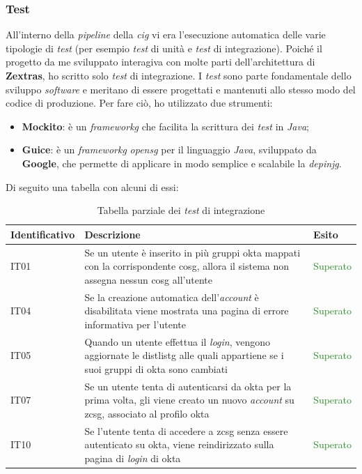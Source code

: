 \subsubsection{Test}
All'interno della \textit{pipeline} della \textit{\gls{cig}} vi era l'esecuzione automatica delle varie tipologie di \textit{test} (per esempio \textit{test} di unità e \textit{test} di integrazione). Poiché il progetto da me sviluppato interagiva con molte parti dell'architettura di \textbf{Zextras}, ho scritto solo \textit{test} di integrazione. I \textit{test} sono parte fondamentale dello sviluppo \textit{software} e meritano di essere progettati e mantenuti allo stesso modo del codice di produzione. Per fare ciò, ho utilizzato due strumenti:
\begin{itemize}
    \item \textbf{Mockito}: è un \textit{\gls{frameworkg}} che facilita la scrittura dei \textit{test} in \textit{Java}; 
    \item \textbf{Guice}: è un \textit{\gls{frameworkg}} \textit{\gls{opensg}} per il linguaggio \textit{Java}, sviluppato da \textbf{Google}, che permette di applicare in modo semplice e scalabile la \textit{\gls{depinjg}}.
\end{itemize}
Di seguito una tabella con alcuni di essi:

\begin{center}
    \begin{table}[h]
    \def\arraystretch{1.65}
    \begin{tabular}{|p{3cm}|p{7cm}|p{2cm}|}
        \hline
        \textbf{Identificativo} & \textbf{Descrizione} & \textbf{Esito} \\ \hline  
        IT01 & Se un utente è inserito in più gruppi \gls{okta} mappati con la corrispondente \gls{cosg}, allora il sistema non assegna nessun \gls{cosg} all'utente & \textcolor{ForestGreen}{Superato}\\ \hline
        IT04 & Se la creazione automatica dell'\textit{account} è disabilitata viene mostrata una pagina di errore informativa per l'utente & \textcolor{ForestGreen}{Superato}\\ \hline
        IT05 & Quando un utente effettua il \textit{login}, vengono aggiornate le \gls{distlistg} alle quali appartiene se i suoi gruppi di \gls{okta} sono cambiati & \textcolor{ForestGreen}{Superato}\\ \hline
        IT07 & Se un utente tenta di autenticarsi da \gls{okta} per la prima volta, gli viene creato un nuovo \textit{account} su \gls{zcsg}, associato al profilo \gls{okta} & \textcolor{ForestGreen}{Superato}\\ \hline
        IT10 & Se l'utente tenta di accedere a \gls{zcsg} senza essere autenticato su \gls{okta}, viene reindirizzato sulla pagina di \textit{login} di \gls{okta} & \textcolor{ForestGreen}{Superato}\\ \hline
    \end{tabular}
    \caption{Tabella parziale dei \textit{test} di integrazione}
    \end{table}
\end{center}

